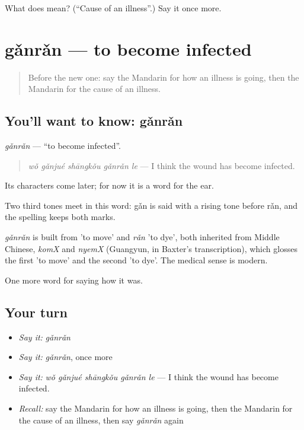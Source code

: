 \begin{tcolorbox}[breakable,colback=teal!4,colframe=teal!35!black,title={Before you move on}]
What does  mean? (\textquotedblleft{}Cause of an illness\textquotedblright{}.) Say it once more.
\end{tcolorbox}
\section[gǎnrǎn]{gǎnrǎn — to become infected}

\label{lesson:ZH-C481-ganran}



\begin{quote}
Before the new one: say the Mandarin for how an illness is going, then the Mandarin for the cause of an illness.
\end{quote}

\subsection*{You'll want to know: gǎnrǎn}
\emph{gǎnrǎn} — \textquotedblleft{}to become infected\textquotedblright{}.

\begin{quote}
\emph{wǒ gǎnjué shāngkǒu gǎnrǎn le} — I think the wound has become infected.
\end{quote}

Its characters come later; for now it is a word for the ear.

Two third tones meet in this word: gǎn is said with a rising tone before rǎn, and the spelling keeps both marks.

\begin{cousinweb}
\emph{gǎnrǎn} is built from  'to move' and \emph{rǎn} 'to dye', both inherited from Middle Chinese, \emph{komX} and \emph{nyemX} (Guangyun, in Baxter's transcription), which glosses the first 'to move' and the second 'to dye'. The medical sense is modern.
\end{cousinweb}

\begin{grammarlens}[title={What you've built}]
One more word for saying how it was.
\end{grammarlens}

\subsection*{Your turn}
\begin{itemize}
\raggedright
  \item \emph{Say it:} \emph{gǎnrǎn}
  \item \emph{Say it:} \emph{gǎnrǎn}, once more
  \item \emph{Say it:} \emph{wǒ gǎnjué shāngkǒu gǎnrǎn le} — I think the wound has become infected.
  \item \emph{Recall:} say the Mandarin for how an illness is going, then the Mandarin for the cause of an illness, then say \emph{gǎnrǎn} again
\end{itemize}

